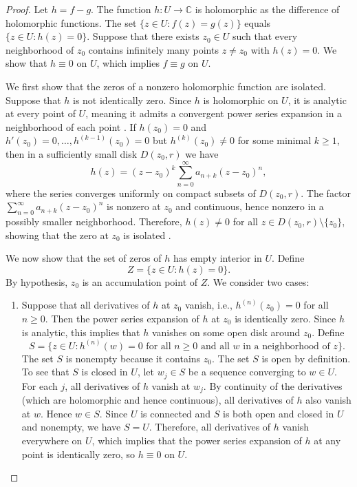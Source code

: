 \begin{proof}
Let $h = f - g$. The function $h : U \to \mathbb{C}$ is holomorphic as the difference of holomorphic functions. The set $\{ z \in U : f(z) = g(z) \}$ equals $\{ z \in U : h(z) = 0 \}$. Suppose that there exists $z_0 \in U$ such that every neighborhood of $z_0$ contains infinitely many points $z \neq z_0$ with $h(z) = 0$. We show that $h \equiv 0$ on $U$, which implies $f \equiv g$ on $U$.

We first show that the zeros of a nonzero holomorphic function are isolated. Suppose that $h$ is not identically zero. Since $h$ is holomorphic on $U$, it is analytic at every point of $U$, meaning it admits a convergent power series expansion in a neighborhood of each point . If $h(z_0) = 0$ and $h'(z_0) = 0, \dots, h^{(k-1)}(z_0) = 0$ but $h^{(k)}(z_0) \neq 0$ for some minimal $k \geq 1$, then in a sufficiently small disk $D(z_0, r)$ we have
$$h(z) = (z - z_0)^k \sum_{n=0}^\infty a_{n+k}(z - z_0)^n,$$
where the series converges uniformly on compact subsets of $D(z_0, r)$. The factor $\sum_{n=0}^\infty a_{n+k}(z - z_0)^n$ is nonzero at $z_0$ and continuous, hence nonzero in a possibly smaller neighborhood. Therefore, $h(z) \neq 0$ for all $z \in D(z_0, r) \setminus \{z_0\}$, showing that the zero at $z_0$ is isolated .

We now show that the set of zeros of $h$ has empty interior in $U$. Define
$$Z = \{ z \in U : h(z) = 0 \}.$$
By hypothesis, $z_0$ is an accumulation point of $Z$. We consider two cases:

\begin{enumerate}
    \item Suppose that all derivatives of $h$ at $z_0$ vanish, i.e., $h^{(n)}(z_0) = 0$ for all $n \geq 0$. Then the power series expansion of $h$ at $z_0$ is identically zero. Since $h$ is analytic, this implies that $h$ vanishes on some open disk around $z_0$. Define
    $$S = \{ z \in U : h^{(n)}(w) = 0 \text{ for all } n \geq 0 \text{ and all } w \text{ in a neighborhood of } z \}.$$
    The set $S$ is nonempty because it contains $z_0$. The set $S$ is open by definition. To see that $S$ is closed in $U$, let $w_j \in S$ be a sequence converging to $w \in U$. For each $j$, all derivatives of $h$ vanish at $w_j$. By continuity of the derivatives (which are holomorphic and hence continuous), all derivatives of $h$ also vanish at $w$. Hence $w \in S$. Since $U$ is connected and $S$ is both open and closed in $U$ and nonempty, we have $S = U$. Therefore, all derivatives of $h$ vanish everywhere on $U$, which implies that the power series expansion of $h$ at any point is identically zero, so $h \equiv 0$ on $U$.


\end{enumerate}
\end{proof}
